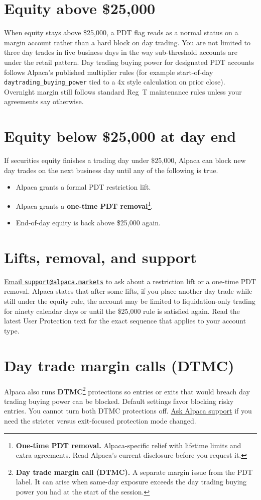 \documentclass{article}
\newcommand{\equitythreshold}{\$25,000}
\begin{document}
\section{Equity above \equitythreshold}
When equity stays above \equitythreshold, a PDT flag reads as a normal status on a margin account rather than a hard block on day trading. You are not limited to three day trades in five business days in the way sub-threshold accounts are under the retail pattern. Day trading buying power for designated PDT accounts follows Alpaca's published multiplier rules (for example start-of-day \texttt{daytrading\_buying\_power} tied to a 4x style calculation on prior close). Overnight margin still follows standard Reg~T maintenance rules unless your agreements say otherwise.

\newpage

\section{Equity below \equitythreshold{} at day end}
If securities equity finishes a trading day under \equitythreshold, Alpaca can block new day trades on the next business day until any of the following is true.
\begin{itemize}
  \item Alpaca grants a formal PDT restriction lift.
  \item Alpaca grants a \textbf{one-time PDT removal}\footnote{\textbf{One-time PDT removal.} Alpaca-specific relief with lifetime limits and extra agreements. Read Alpaca's current disclosure before you request it.}.
  \item End-of-day equity is back above \equitythreshold{} again.
\end{itemize}

\section{Lifts, removal, and support}
\uline{Email \texttt{support@alpaca.markets}} to ask about a restriction lift or a one-time PDT removal. Alpaca states that after some lifts, if you place another day trade while still under the equity rule, the account may be limited to liquidation-only trading for ninety calendar days or until the \equitythreshold{} rule is satisfied again. Read the latest User Protection text for the exact sequence that applies to your account type.

\section{Day trade margin calls (DTMC)}
Alpaca also runs \textbf{DTMC}\footnote{\textbf{Day trade margin call (DTMC).} A separate margin issue from the PDT label. It can arise when same-day exposure exceeds the day trading buying power you had at the start of the session.} protections so entries or exits that would breach day trading buying power can be blocked. Default settings favor blocking risky entries. You cannot turn both DTMC protections off. \uline{Ask Alpaca support} if you need the stricter versus exit-focused protection mode changed.
\end{document}
